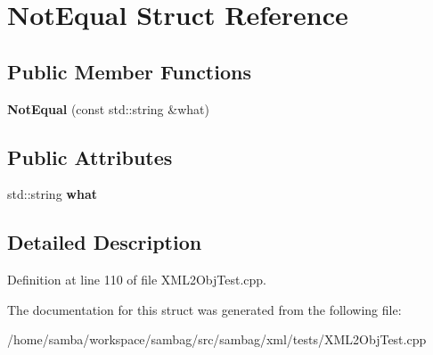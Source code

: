 \hypertarget{struct_not_equal}{
\section{NotEqual Struct Reference}
\label{struct_not_equal}
}
\subsection*{Public Member Functions}
\begin{DoxyCompactItemize}
\item 
\hypertarget{struct_not_equal_a71acb1cc5a8ebf8ce1c32cba0f6d9d10}{
{\bfseries NotEqual} (const std::string \&what)}
\label{struct_not_equal_a71acb1cc5a8ebf8ce1c32cba0f6d9d10}

\end{DoxyCompactItemize}
\subsection*{Public Attributes}
\begin{DoxyCompactItemize}
\item 
\hypertarget{struct_not_equal_a9d7ee077a6548cfb499c61f13f7fa777}{
std::string {\bfseries what}}
\label{struct_not_equal_a9d7ee077a6548cfb499c61f13f7fa777}

\end{DoxyCompactItemize}


\subsection{Detailed Description}


Definition at line 110 of file XML2ObjTest.cpp.



The documentation for this struct was generated from the following file:\begin{DoxyCompactItemize}
\item 
/home/samba/workspace/sambag/src/sambag/xml/tests/XML2ObjTest.cpp\end{DoxyCompactItemize}
